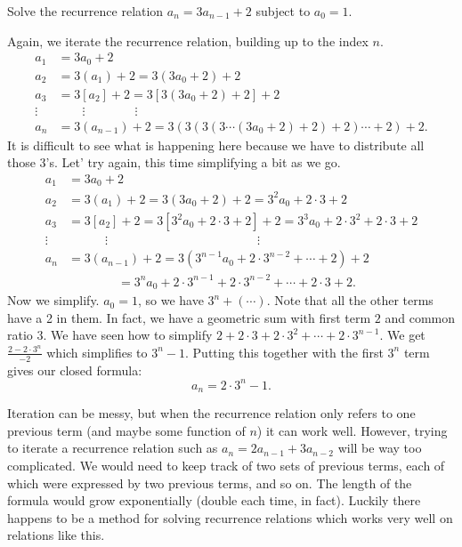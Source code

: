 \documentclass[12pt]{article}
\begin{document}
 \begin{example}
   Solve the recurrence relation $a_n = 3a_{n-1} + 2$ subject to $a_0 = 1$.
   \begin{solution}
     Again, we iterate the recurrence relation, building up to the index $n$.
     \begin{align*}
      a_1 &= 3a_0 + 2\\
      a_2 &= 3(a_1) + 2 = 3(3a_0 + 2) + 2\\
      a_3 &= 3[a_2] + 2 = 3[3(3a_0 + 2) + 2] + 2\\
      \vdots & \qquad \vdots \qquad \qquad \vdots \\
      a_n &= 3(a_{n-1}) + 2 = 3(3(3(3\cdots(3a_0 + 2) + 2) + 2)\cdots + 2)+ 2.
     \end{align*}
	 It is difficult to see what is happening here because we have to distribute all those 3's.  Let' try again, this time simplifying a bit as we go.
	      \begin{align*}
      a_1 &= 3a_0 + 2\\
      a_2 &= 3(a_1) + 2 = 3(3a_0 + 2) + 2 = 3^2a_0 + 2\cdot 3 + 2\\
      a_3 &= 3[a_2] + 2 = 3[3^2a_0 + 2\cdot 3 + 2] + 2 = 3^3 a_0 + 2 \cdot 3^2 + 2 \cdot 3 + 2\\
      \vdots & \qquad\quad \vdots \hspace{2in} \vdots \\
      a_n &= 3(a_{n-1}) + 2 = 3(3^{n-1}a_0 + 2 \cdot 3^{n-2} + \cdots +2)+ 2\\
      & \qquad \qquad = 3^n a_0 + 2\cdot 3^{n-1} + 2 \cdot 3^{n-2} + \cdots + 2\cdot 3 + 2.
     \end{align*}
    Now we simplify.  $a_0 = 1$, so we have $3^n + (\cdots)$.  Note that all the other terms have a 2 in them.  In fact, we have a geometric sum with first term $2$ and common ratio $3$.  We have seen how to simplify $2 + 2\cdot 3 + 2 \cdot 3^2 + \cdots + 2\cdot 3^{n-1}$.  We get $\frac{2-2\cdot 3^n}{-2}$ which simplifies to $3^n - 1$.  Putting this together with the first $3^n$ term gives our closed formula:
    \[a_n = 2\cdot 3^n - 1.\]
   \end{solution}
 \end{example}


 Iteration can be messy, but when the recurrence relation only refers to one previous term (and maybe some function of $n$) it can work well.  However, trying to iterate a recurrence relation such as $a_n = 2 a_{n-1} + 3 a_{n-2}$ will be way too complicated.  We would need to keep track of two sets of previous terms, each of which were expressed by two previous terms, and so on.  The length of the formula would grow exponentially (double each time, in fact).  Luckily there happens to be a method for solving recurrence relations which works very well on relations like this.
\end{document}
